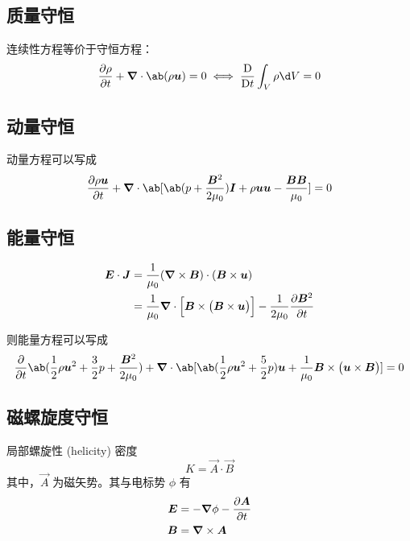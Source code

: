\subsection{质量守恒}

连续性方程等价于守恒方程：
\begin{equation}
    \pdv{\rho}{t} + \dive{\ab(\rho \vec{u})} = 0
\iff\mdv{}{t} \int_V \rho \d V = 0
\end{equation}

\subsection{动量守恒}

动量方程可以写成
\begin{equation}
\pdv{\rho \vec{u}}{t} + \dive{\ab[
    \ab(p + \frac{\vec{B}^2}{2 \mu_0}) \vec{I}
    + \rho \vec{u} \vec{u}
    - \frac{\vec{B} \vec{B}}{\mu_0}
]} = 0
\end{equation}

\subsection{能量守恒}

\begin{equation}\begin{aligned}
\bm{E} \cdot \bm{J} &= \frac{1}{\mu_0} (\bm{\nabla} \times{\bm{B}}) \cdot (\bm{B} \times \bm{u}) \\
&= \frac{1}{\mu_0} \bm{\nabla} \cdot{\Big[ \bm{B} \times \big(\bm{B} \times \bm{u} \big) \Big]}
    - \frac{1}{2 \mu_0} \pdv{\bm{B}^2}{t}
\end{aligned}\end{equation}

则能量方程可以写成
\begin{equation}
\pdv{}{t}\ab(
    \frac{1}{2} \rho \vec{u}^2
    + \frac{3}{2} p
    + \frac{\vec{B}^2}{2 \mu_0}
)
+ \dive{\ab[
    \ab( \frac{1}{2} \rho \vec{u}^2 + \frac{5}{2} p  ) \vec{u}
    + \frac{1}{\mu_0} \vec{B} \times \big( \vec{u} \times \vec{B} \big)
]} = 0
\end{equation}

\subsection{磁螺旋度守恒}

局部螺旋性 (helicity) 密度
\begin{equation}
    K = \vec{A} \cdot \vec{B}
\end{equation}
其中，$\vec{A}$ 为磁矢势。其与电标势 $\phi$ 有
\begin{align}
    \bm{E} &= - \bm{\nabla}{\phi} - \pdv{\bm{A}}{t} \\
    \bm{B} &= \bm{\nabla} \times{\bm{A}}
\end{align}


